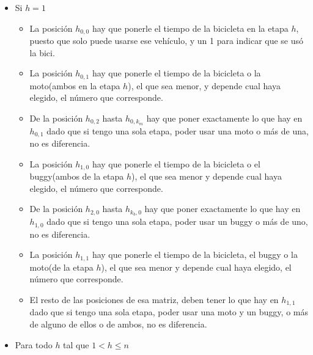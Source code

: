 \begin{itemize}
	\item Si $h=1$
	\begin{itemize}
		\item La posición $h_{0,0}$ hay que ponerle el tiempo de la bicicleta en la etapa $h$, puesto que solo puede usarse ese vehículo, y un 1 para indicar que se usó la bici.
		\item La posición $h_{0,1}$ hay que ponerle el tiempo de la bicicleta o la moto(ambos en la etapa $h$), el que sea menor, y depende cual haya elegido, el número que corresponde.
		\item De la posición $h_{0,2}$ hasta $h_{0,k_{m}}$ hay que poner exactamente lo que hay en $h_{0,1}$ dado que si tengo una sola etapa, poder usar una moto o más de una, no es diferencia.
		\item La posición $h_{1,0}$ hay que ponerle el tiempo de la bicicleta o el buggy(ambos de la etapa $h$), el que sea menor y depende cual haya elegido, el número que corresponde.
		\item De la posición $h_{2,0}$ hasta $h_{k_{b},0}$ hay que poner exactamente lo que hay en $h_{1,0}$ dado que si tengo una sola etapa, poder usar un buggy o más de uno, no es diferencia.
		\item La posición $h_{1,1}$ hay que ponerle el tiempo de la bicicleta, el buggy o la moto(de la etapa $h$), el que sea menor y depende cual haya elegido, el número que corresponde.
		\item El resto de las posiciones de esa matriz, deben tener lo que hay en $h_{1,1}$ dado que si tengo una sola etapa, poder usar una moto y un buggy, o más de alguno de ellos o de ambos, no es diferencia.

	\end{itemize}

	\item Para todo $h$ tal que $1 < h \leq n$

	\begin{itemize}


\end{itemize}
\end{itemize}
